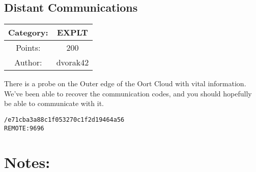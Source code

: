 \begin{center}
\section*{Distant Communications}
{\large
\begin{tabular}{| c c |}
\hline
Category: & EXPLT\\\hline
Points: & 200\\\hline
Author: & dvorak42\\\hline
\end{tabular}
}
\end{center}
\vspace{0.5in}

{\large
There is a probe on the Outer edge of the Oort Cloud with vital information. We've been able to recover the communication codes, and you should hopefully be able to communicate with it.
}
\vspace{0.25in}
\begin{center}
  {\Large\tt /e71cba3a88c1f053270c1f2d19464a56}\\
  {\Large\tt REMOTE:9696}
\end{center}

\vspace{0.25in}
\section*{Notes:}

